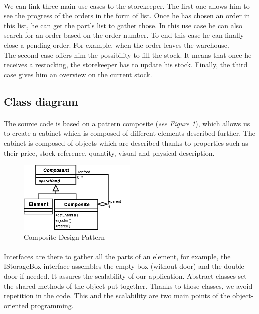 \documentclass[12pt,oneside]{report}
\begin{document}
        \paragraph{}
        We can link three main use cases to the storekeeper. The first one allows him to see the progress of the orders in the form of list. Once he has chosen an order in this list, he can get the part’s list to gather those. In this use case he can also search for an order based on the order number. To end this case he can finally close a pending order. For example, when the order leaves the warehouse.\\
        The second case offers him the possibility to fill the stock. It means that once he receives a restocking, the storekeeper has to update his stock. Finally, the third case gives him an overview on the current stock.
    
    \newpage
    \subsection{Class diagram}
        \paragraph{}
        The source code is based on a pattern composite (\textit{see Figure \ref{compositepattern}}), which allows us to create a cabinet which is composed of different elements described further. The cabinet is composed of objects which are described thanks to properties such as their price, stock reference, quantity, visual and physical description.
        \vspace{\baselineskip}
        
        \begin{figure}[h!]
            \centering
			\includegraphics[width = 0.5\textwidth]{Figures/composite.png}
			\caption{Composite Design Pattern}
			\label{compositepattern}
		\end{figure} 
			
        \paragraph{}
        Interfaces are there to gather all the parts of an element, for example, the IStorageBox interface assembles the empty box (without door) and the double door if needed. It assures the scalability of our application. Abstract classes set the shared methods of the object put together. Thanks to those classes, we avoid repetition in the code. This and the scalability are two main points of the object-oriented programming.
        
\end{document}
